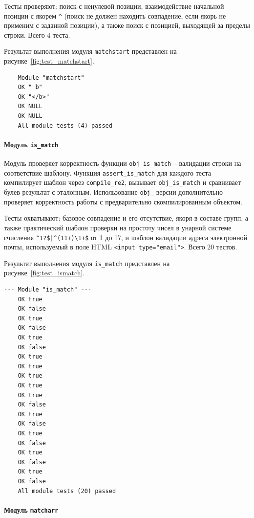 Тесты проверяют: поиск с ненулевой позиции, взаимодействие начальной позиции с якорем \verb`^` (поиск не должен находить совпадение, если якорь не применим с заданной позиции), а также поиск с позицией, выходящей за пределы строки. Всего 4 теста.

Результат выполнения модуля \verb`matchstart` представлен на рисунке~\ref{fig:test_matchstart}.
\\

\begin{lstlisting}[caption={Результат выполнения модуля matchstart}, label={fig:test_matchstart}]
	--- Module "matchstart" ---
	OK " b"
	OK "</b>"
	OK NULL
	OK NULL
	All module tests (4) passed
\end{lstlisting}

\paragraph{Модуль \texttt{is\_match}}

Модуль проверяет корректность функции \verb`obj_is_match` -- валидации строки на соответствие шаблону. Функция \verb`assert_is_match` для каждого теста компилирует шаблон через \verb`compile_re2`, вызывает \verb`obj_is_match` и сравнивает булев результат с эталонным. Использование \verb`obj_`-версии дополнительно проверяет корректность работы с предварительно скомпилированным объектом.

Тесты охватывают: базовое совпадение и его отсутствие, якоря в составе групп, а также практический шаблон проверки на простоту чисел в унарной системе счисления \verb`^1?$|^(11+)\1+$` от 1 до 17, и шаблон валидации адреса электронной почты, используемый в поле HTML \verb`<input type="email">`. Всего 20 тестов.

Результат выполнения модуля \verb`is_match` представлен на рисунке~\ref{fig:test_ismatch}.

\begin{lstlisting}[caption={Результат выполнения модуля ismatch}, label={fig:test_ismatch}]
	--- Module "is_match" ---
	OK true
	OK false
	OK true
	OK false
	OK true
	OK false
	OK true
	OK true
	OK true
	OK true
	OK true
	OK false
	OK true
	OK false
	OK true
	OK false
	OK true
	OK false
	OK true
	OK false
	All module tests (20) passed
\end{lstlisting}

\paragraph{Модуль \texttt{matcharr}}

